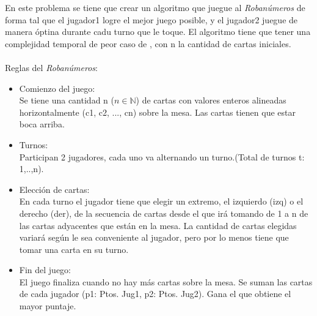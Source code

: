 \documentclass[11pt, a4paper, twoside]{article}
\begin{document}
{}



En este problema se tiene que crear un algoritmo que juegue al \textit{Robanúmeros} de forma tal 
que el jugador1 logre el mejor juego posible, y el jugador2 juegue de manera óptina durante cadu turno que le toque.
El algoritmo tiene que tener una complejidad temporal de peor caso de , con n la cantidad de cartas
iniciales.\\
\\
Reglas del \textit{Robanúmeros}: 
\begin{itemize}
  \item Comienzo del juego: \\
  Se tiene una cantidad n ($n \in \mathbb{N}$) de cartas con valores enteros alineadas
  horizontalmente (c1, c2, ..., cn) sobre la mesa. Las cartas tienen que estar boca arriba. 
  \item Turnos: \\
  Participan 2 jugadores, cada uno va alternando un turno.(Total de turnos t: 1,..,n).  
  \item Elección de cartas: \\
  En cada turno el jugador tiene que elegir un extremo, el izquierdo (izq) o el derecho (der), de 
  la secuencia de cartas desde el que irá tomando de 1 a n de las cartas adyacentes que están en la mesa. 
  La cantidad de cartas elegidas variará según le sea conveniente al jugador, pero por lo menos tiene que tomar una 
  carta en su turno. 
  \item Fin del juego: \\
  El juego finaliza cuando no hay más cartas sobre la mesa. Se suman las cartas de cada 
  jugador (p1: Ptos. Jug1, p2: Ptos. Jug2). Gana el que obtiene el mayor puntaje.
\end{itemize}
\end{document}
